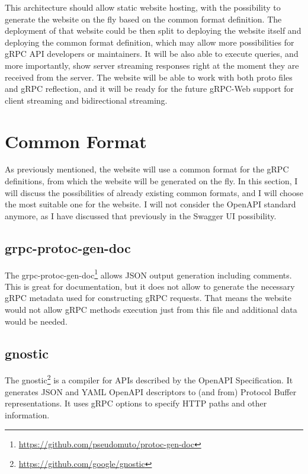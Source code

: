 This architecture should allow static website hosting, with the possibility to generate the website on the fly based on the common format definition.
The deployment of that website could be then split to deploying the website itself and deploying the common format definition, which may allow more possibilities for gRPC API developers or maintainers.
It will be also able to execute queries, and more importantly, show server streaming responses right at the moment they are received from the server.
The website will be able to work with both proto files and gRPC reflection, and it will be ready for the future gRPC-Web support for client streaming and bidirectional streaming.


\section{Common Format}
As previously mentioned, the website will use a common format for the gRPC definitions, from which the website will be generated on the fly.
In this section, I will discuss the possibilities of already existing common formats, and I will choose the most suitable one for the website.
I will not consider the OpenAPI standard anymore, as I have discussed that previously in the Swagger UI possibility.


\subsection{grpc-protoc-gen-doc}
The grpc-protoc-gen-doc\footnote{\url{https://github.com/pseudomuto/protoc-gen-doc}} allows JSON output generation including comments.
This is great for documentation, but it does not allow to generate the necessary gRPC metadata used for constructing gRPC requests.
That means the website would not allow gRPC methods execution just from this file and additional data would be needed.

\subsection{gnostic}
The gnostic\footnote{\url{https://github.com/google/gnostic}} is a compiler for APIs described by the OpenAPI Specification.
It generates JSON and YAML OpenAPI descriptors to (and from) Protocol Buffer representations.
It uses gRPC options to specify HTTP paths and other information.
\cite{gnostic}


